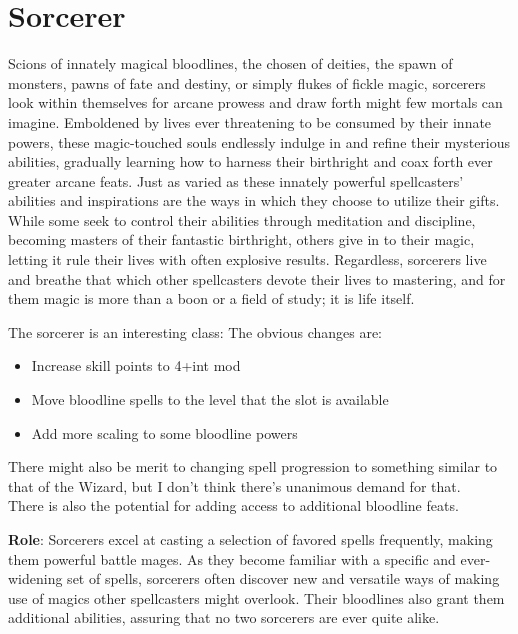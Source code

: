 \section{Sorcerer}

\label{f0}				
Scions of innately magical bloodlines, the chosen of deities, the spawn of monsters, pawns of fate and destiny, or simply flukes of fickle magic, sorcerers look within themselves for arcane prowess and draw forth might few mortals can imagine. Emboldened by lives ever threatening to be consumed by their innate powers, these magic-touched souls endlessly indulge in and refine their mysterious abilities, gradually learning how to harness their birthright and coax forth ever greater arcane feats. Just as varied as these innately powerful spellcasters' abilities and inspirations are the ways in which they choose to utilize their gifts. While some seek to control their abilities through meditation and discipline, becoming masters of their fantastic birthright, others give in to their magic, letting it rule their lives with often explosive results. Regardless, sorcerers live and breathe that which other spellcasters devote their lives to mastering, and for them magic is more than a boon or a field of study; it is life itself.

\begin{formal}
 The sorcerer is an interesting class: The obvious changes are:
 \begin{itemize}
  \item Increase skill points to 4+int mod
  \item Move bloodline spells to the level that the slot is available
  \item Add more scaling to some bloodline powers
 \end{itemize}
 There might also be merit to changing spell progression to something similar to that of the Wizard, but
 I don't think there's unanimous demand for that. \\
 There is also the potential for adding access to additional bloodline feats.
\end{formal}


\textbf{Role}: Sorcerers excel at casting a selection of favored spells frequently, making them powerful battle
mages. As they become familiar with a specific and ever-widening set of spells, sorcerers often discover new and
versatile ways of making use of magics other spellcasters might overlook. Their bloodlines also grant them
additional abilities, assuring that no two sorcerers are ever quite alike.
				

